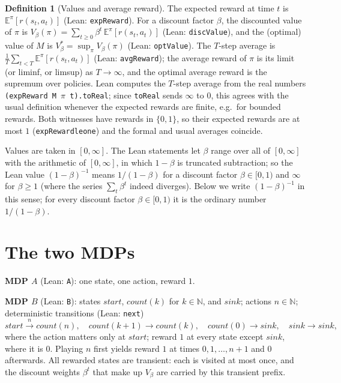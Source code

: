 \documentclass[11pt]{article}
\theoremstyle{definition}
\newtheorem{definition}[theorem]{Definition}
\theoremstyle{remark}
\renewcommand{\_}{\oldus\allowbreak}
\begin{document}
\begin{definition}[Values and average reward]
The expected reward at time $t$ is $\mathbb E^\pi[r(s_t,a_t)]$ (Lean: \texttt{expReward}). For a
discount factor $\beta$, the discounted value of $\pi$ is $V_\beta(\pi)=\sum_{t\ge0}\beta^t\,
\mathbb E^\pi[r(s_t,a_t)]$ (Lean: \texttt{discValue}), and the (optimal) value of $M$ is
$V^*_\beta=\sup_\pi V_\beta(\pi)$ (Lean: \texttt{optValue}). The $T$-step average is
$\frac1T\sum_{t<T}\mathbb E^\pi[r(s_t,a_t)]$ (Lean: \texttt{avgReward}); the average reward of $\pi$
is its limit (or liminf, or limsup) as $T\to\infty$, and the optimal average reward is the supremum
over policies. Lean computes the $T$-step average from the real numbers
\texttt{(expReward M $\pi$ t).toReal}; since \texttt{toReal} sends $\infty$ to $0$, this agrees with
the usual definition whenever the expected rewards are finite, e.g.\ for bounded rewards. Both
witnesses have rewards in $\{0,1\}$, so their expected rewards are at most $1$
(\texttt{expReward\_le\_one}) and the formal and usual averages coincide.

Values are taken in $[0,\infty]$. The Lean statements let $\beta$ range over all of $[0,\infty]$ with
the arithmetic of $[0,\infty]$, in which $1-\beta$ is truncated subtraction; so the Lean value
$(1-\beta)^{-1}$ means $1/(1-\beta)$ for a discount factor $\beta\in[0,1)$ and $\infty$ for
$\beta\ge1$ (where the series $\sum_t\beta^t$ indeed diverges). Below we write $(1-\beta)^{-1}$ in
this sense; for every discount factor $\beta\in[0,1)$ it is the ordinary number $1/(1-\beta)$.
\end{definition}

\section{The two MDPs}

\textbf{MDP $A$} (Lean: \texttt{A}): one state, one action, reward $1$.

\textbf{MDP $B$} (Lean: \texttt{B}): states $\mathit{start}$, $\mathit{count}(k)$ for $k\in\mathbb N$, and
$\mathit{sink}$; actions $n\in\mathbb N$; deterministic transitions (Lean: \texttt{next})
\[ \mathit{start}\xrightarrow{n}\mathit{count}(n),\quad \mathit{count}(k+1)\to\mathit{count}(k),\quad
\mathit{count}(0)\to\mathit{sink},\quad \mathit{sink}\to\mathit{sink}, \]
where the action matters only at $\mathit{start}$; reward $1$ at every state except $\mathit{sink}$,
where it is $0$. Playing $n$ first yields reward $1$ at times $0,1,\dots,n+1$ and $0$ afterwards.
All rewarded states are transient: each is visited at most once, and the discount weights
$\beta^t$ that make up $V_\beta$ are carried by this transient prefix.
\end{document}
